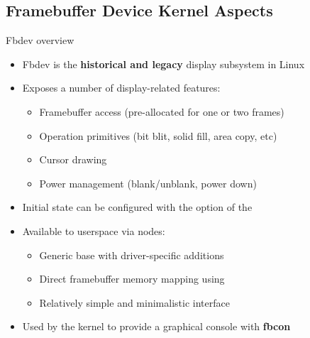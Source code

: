 \subsection{Framebuffer Device Kernel Aspects}

\begin{frame}{Fbdev overview}
  \begin{itemize}
  \item Fbdev is the \textbf{historical and legacy} display subsystem in Linux
  \item Exposes a number of display-related features:
    \begin{itemize}
    \item Framebuffer access (pre-allocated for one or two frames)
    \item Operation primitives (bit blit, solid fill, area copy, etc)
    \item Cursor drawing
    \item Power management (blank/unblank, power down)
    \end{itemize}
  \item Initial state can be configured with the  option of the 
  \item Available to userspace via  nodes:
    \begin{itemize}
    \item Generic base  with driver-specific additions
    \item Direct framebuffer memory mapping using 
    \item Relatively simple and minimalistic interface
    \end{itemize}
  \item Used by the kernel to provide a graphical console with \textbf{fbcon}
  \end{itemize}
\end{frame}

